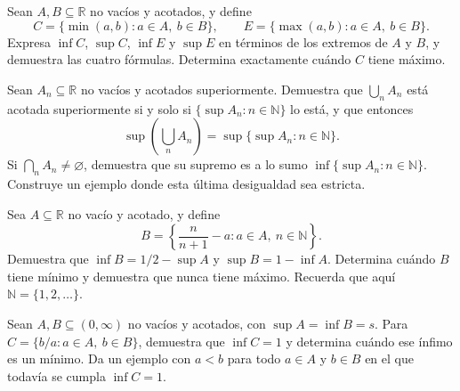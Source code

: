 \begin{samepage}
\begin{problem}\label{prob:reto-extremos-06}
Sean $A,B\subseteq\mathbb R$ no vacíos y acotados, y define
\[
C=\{\min(a,b):a\in A,\ b\in B\},\qquad
E=\{\max(a,b):a\in A,\ b\in B\}.
\]
Expresa $\inf C$, $\sup C$, $\inf E$ y $\sup E$ en términos de los extremos de $A$ y $B$, y demuestra las cuatro fórmulas. Determina exactamente cuándo $C$ tiene máximo.
\end{problem}
\end{samepage}
\par{}

\begin{samepage}
\begin{problem}\label{prob:reto-extremos-07}
Sean $A_n\subseteq\mathbb R$ no vacíos y acotados superiormente. Demuestra que $\bigcup_n A_n$ está acotada superiormente si y solo si $\{\sup A_n:n\in\mathbb N\}$ lo está, y que entonces
\[
\sup\left(\bigcup_n A_n\right)=\sup\{\sup A_n:n\in\mathbb N\}.
\]
Si $\bigcap_n A_n\ne\varnothing$, demuestra que su supremo es a lo sumo $\inf\{\sup A_n:n\in\mathbb N\}$. Construye un ejemplo donde esta última desigualdad sea estricta.
\end{problem}
\end{samepage}
\par{}

\begin{samepage}
\begin{problem}\label{prob:reto-extremos-08}
Sea $A\subseteq\mathbb R$ no vacío y acotado, y define
\[
B=\left\{\frac{n}{n+1}-a:a\in A,\ n\in\mathbb N\right\}.
\]
Demuestra que $\inf B=1/2-\sup A$ y $\sup B=1-\inf A$. Determina cuándo $B$ tiene mínimo y demuestra que nunca tiene máximo. Recuerda que aquí $\mathbb N=\{1,2,\ldots\}$.~\cite{mseSupParam}
\end{problem}
\end{samepage}
\par{}

\begin{samepage}
\begin{problem}\label{prob:reto-extremos-09}
Sean $A,B\subseteq(0,\infty)$ no vacíos y acotados, con $\sup A=\inf B=s$. Para $C=\{b/a:a\in A,\ b\in B\}$, demuestra que $\inf C=1$ y determina cuándo ese ínfimo es un mínimo. Da un ejemplo con $a<b$ para todo $a\in A$ y $b\in B$ en el que todavía se cumpla $\inf C=1$.~\cite{mseCocientes}
\end{problem}
\end{samepage}
\par{}

